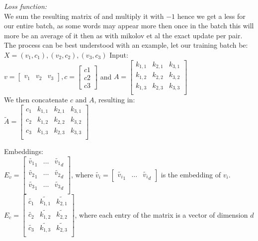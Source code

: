 \textit{Loss function:}\\
We sum the resulting matrix of and multiply it with $-1$  hence we get a less for our entire batch, as some words may appear more then once in the batch this will more be an average of it then as with mikolov et al the exact update per pair. \\
The process can be best understood with an example, let our training batch be:\\ $X = {(v_1,c_1),(v_2,c_2),(v_3,c_3)}$
Input:\\
 $v = \begin{bmatrix}
v_1 & v_2 & v_3
\end{bmatrix}, c = \begin{bmatrix}
c1\\
c2\\
c3\end{bmatrix}$ and $A = 
\begin{bmatrix}
k_{1,1} & k_{2,1} & k_{3,1}\\
k_{1,2} & k_{2,2} & k_{3,2}\\
k_{1,3} & k_{2,3} & k_{3,3}\\
\end{bmatrix}$\\

 We then concatenate $c$ and $A$, 
resulting in: \\
$\tilde{A} = \begin{bmatrix}
c_1 & k_{1,1} & k_{2,1} & k_{3,1}\\
c_2 & k_{1,2} & k_{2,2} & k_{3,2}\\
c_3 & k_{1,3} & k_{2,3}& k_{3,3}\\
\end{bmatrix}$

Embeddings:\\
$E_v = \begin{bmatrix}
\tilde{v_1}_1 & \ldots & \tilde{v_1}_d\\
\tilde{v_2}_1 & \ldots & \tilde{v_2}_d\\
\tilde{v_3}_1 & \ldots & \tilde{v_3}_d\\
\end{bmatrix}
$, where $\tilde{v_i} = \begin{bmatrix}
\tilde{v_i}_1 & \ldots & \tilde{v_i}_d \end{bmatrix}$ is the embedding of $v_i$.  \\$E_c = \begin{bmatrix}
\tilde{c_1 }& \tilde{k_{1,1}} & \tilde{k_{2,1}} \\
\tilde{c_2 }& \tilde{k_{1,2}}& \tilde{k_{2,2}} \\
\tilde{c_3 }&\tilde{ k_{1,3} }& \tilde{k_{2,3}}\\
\end{bmatrix}$,
where each entry of the matrix is a vector of dimension $d$\\

